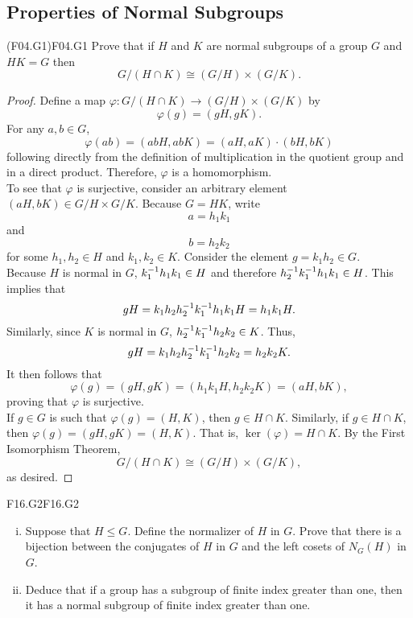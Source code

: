 \documentclass[../../AlgebraQualSolutions.tex]{subfiles}
\begin{document}
\subsection{Properties of Normal Subgroups}

\begin{prob}{(F04.G1)}{F04.G1}
	Prove that if $H$ and $K$ are normal subgroups of a group $G$ and $HK = G$ then	
		\[G/(H \cap K) \cong (G/H) \times (G/K).\]
\end{prob}

\begin{proof}
	Define a map $\varphi: G/(H \cap K) \to (G/H) \times (G/K)$ by 
		\[\varphi(g) = (gH,gK).\]
	For any $a,b \in G$,
		\[\varphi(ab) = (abH, abK) = (aH,aK)\cdot(bH,bK)\]
	following directly from the definition of multiplication in the quotient group and in a direct product. Therefore, $\varphi$ is a homomorphism.\\

	To see that $\varphi$ is surjective, consider an arbitrary element $(aH,bK) \in G/H \times G/K$. Because $G = HK$, write
		\[a = h_1k_1\]
	and
		\[b = h_2k_2\]
	for some $h_1,h_2 \in H$ and $k_1,k_2 \in K$. Consider the element $g = k_1 h_2 \in G$.\\

	Because $H$ is normal in $G$, $k_1^{-1} h_1 k_1 \in H$ and therefore $h_2^{-1} k_1^{-1} h_1 k_1 \in H$. This implies that
		\[g H = k_1h_2h_2^{-1} k_1^{-1} h_1 k_1 H = h_1 k_1 H.\]
	Similarly, since $K$ is normal in $G$, $h_2^{-1} k_1^{-1} h_2k_2 \in K$. Thus,
		\[g H = k_1h_2 h_2^{-1} k_1^{-1} h_2k_2 = h_2 k_2 K. \]
	It then follows that
		\[\varphi(g) = (gH, gK) = (h_1 k_1 H,  h_2 k_2 K) = (aH, bK),\]
	proving that $\varphi$ is surjective.\\

	If $g \in G$ is such that $\varphi(g) = (H,K)$, then $g \in H \cap K$. Similarly, if $g \in H \cap K$, then $\varphi(g) = (gH,gK) = (H,K)$. That is, $\ker(\varphi) = H \cap K$. By the First Isomorphism Theorem,
		\[G/(H \cap K) \cong (G/H) \times (G/K),\]
	as desired.
\end{proof}

	\begin{prob}{F16.G2}{F16.G2}
		\begin{enumerate}[(i)]
			\item Suppose that $H \leq G$. Define the normalizer of $H$ in $G$. Prove that there is a bijection between the conjugates of $H$ in $G$ and the left cosets of $N_G(H)$ in $G$.
			\item Deduce that if a group has a subgroup of finite index greater than one, then it has a normal subgroup of finite index greater than one.
		\end{enumerate}
	\end{prob}
\end{document}
